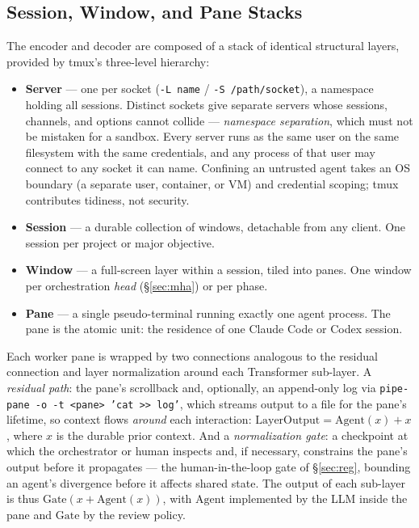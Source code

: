 \documentclass[10pt]{article}
\newcommand{\code}[1]{\texttt{\small #1}}
\begin{document}
\subsection{Session, Window, and Pane Stacks}\label{sec:stacks}

The encoder and decoder are composed of a stack of identical structural layers,
provided by tmux's three-level hierarchy:

\begin{itemize}
\item \textbf{Server} --- one per socket (\code{-L name} / \code{-S /path/socket}), a
namespace holding all sessions. Distinct sockets give separate servers whose
sessions, channels, and options cannot collide --- \emph{namespace separation},
which must not be mistaken for a sandbox. Every server runs as the same user on the
same filesystem with the same credentials, and any process of that user may connect
to any socket it can name. Confining an untrusted agent takes an OS boundary (a
separate user, container, or VM) and credential scoping; tmux contributes tidiness,
not security.
\item \textbf{Session} --- a durable collection of windows, detachable from any client.
One session per project or major objective.
\item \textbf{Window} --- a full-screen layer within a session, tiled into panes. One
window per orchestration \emph{head} (\S\ref{sec:mha}) or per phase.
\item \textbf{Pane} --- a single pseudo-terminal running exactly one agent process. The
pane is the atomic unit: the residence of one Claude Code or Codex session.
\end{itemize}

Each worker pane is wrapped by two connections analogous to the residual connection
and layer normalization around each Transformer sub-layer. A \emph{residual path}:
the pane's scrollback and, optionally, an append-only log via
\code{pipe-pane -o -t <pane> 'cat >> log'}, which streams output to a file for the
pane's lifetime, so context flows \emph{around} each interaction:
$\mathrm{LayerOutput} = \mathrm{Agent}(x) + x$, where $x$ is the durable prior
context. And a \emph{normalization gate}: a checkpoint at which the orchestrator or
human inspects and, if necessary, constrains the pane's output before it propagates
--- the human-in-the-loop gate of \S\ref{sec:reg}, bounding an agent's divergence
before it affects shared state. The output of each sub-layer is thus
$\mathrm{Gate}\!\left(x + \mathrm{Agent}(x)\right)$, with $\mathrm{Agent}$
implemented by the LLM inside the pane and $\mathrm{Gate}$ by the review policy.
\end{document}
